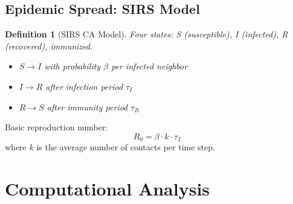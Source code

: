 \documentclass[a4paper, 11pt]{article}
\newtheorem{definition}{Definition}[section]
\begin{document}
\subsection{Epidemic Spread: SIRS Model}

\begin{definition}[SIRS CA Model]
Four states: S (susceptible), I (infected), R (recovered), immunized.
\begin{itemize}
\item $S \to I$ with probability $\beta$ per infected neighbor
\item $I \to R$ after infection period $\tau_I$
\item $R \to S$ after immunity period $\tau_R$
\end{itemize}
\end{definition}

Basic reproduction number:
\begin{equation}
R_0 = \beta \cdot k \cdot \tau_I
\end{equation}
where $k$ is the average number of contacts per time step.

\section{Computational Analysis}
\end{document}
